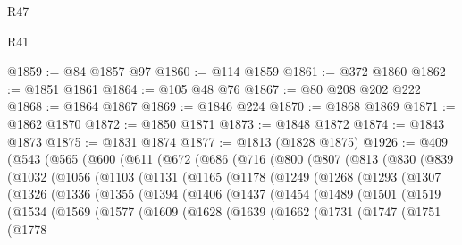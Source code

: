 \begin{lexlean}{R47}
\begin{lexlean}{R41}
\begin{coremodule}
{{{{{{{{{{{{{{{{{{{{{{{{{{{{{{{{{{{{{{{{{{{{{{{{{{{{{{{{{{{{{{{{{{{{{{{{{{{{{{{{{{{{{{{@1859 := @84 @1857 @97
@1860 := @114 @1859
@1861 := @372 @1860
@1862 := @1851 @1861
@1864 := @105 @48 @76
@1867 := @80 @208 @202 @222
@1868 := @1864 @1867
@1869 := @1846 @224
@1870 := @1868 @1869
@1871 := @1862 @1870
@1872 := @1850 @1871
@1873 := @1848 @1872
@1874 := @1843 @1873
@1875 := @1831 @1874
@1877 := @1813 (@1828 @1875)
@1926 := @409
    (@543
      (@565
        (@600
          (@611
            (@672
              (@686
                (@716
                  (@800
                    (@807
                      (@813
                        (@830
                          (@839
                            (@1032
                              (@1056
                                (@1103
                                  (@1131
                                    (@1165
                                      (@1178
                                        (@1249
                                          (@1268
                                            (@1293
                                              (@1307
                                                (@1326
                                                  (@1336
                                                    (@1355
                                                      (@1394
                                                        (@1406
                                                          (@1437
                                                            (@1454
                                                              (@1489
                                                                (@1501
                                                                  (@1519
                                                                    (@1534
                                                                      (@1569
                                                                        (@1577
                                                                          (@1609
                                                                            (@1628
                                                                              (@1639
                                                                                (@1662
                                                                                  (@1731
                                                                                    (@1747
                                                                                      (@1751
                                                                                        (@1778
}}}}}}}}}}}}}}}}}}}}}}}}}}}}}}}}}}}}}}}}}}}}}}}}}}}}}}}}}}}}}}}}}}}}}}}}}}}}}}}}}}}}}}}
\end{coremodule}
\end{lexlean}
\end{lexlean}
